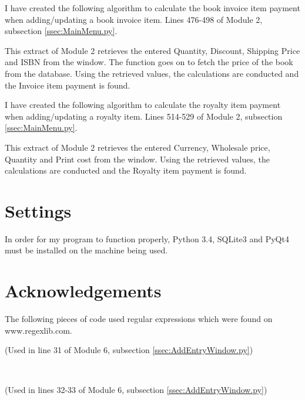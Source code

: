 I have created the following algorithm to calculate the book invoice item payment when adding/updating a book invoice item.
Lines 476-498 of Module 2, subsection \ref{ssec:MainMenu.py}.
\begin{tiny}
\end{tiny}
This extract of Module 2 retrieves the entered Quantity, Discount, Shipping Price and ISBN from the window. The function goes on to fetch the price of the book from the database. Using the retrieved values, the calculations are conducted and the Invoice item payment is found.

I have created the following algorithm to calculate the royalty item payment when adding/updating a royalty item.
Lines 514-529 of Module 2, subsection \ref{ssec:MainMenu.py}.
\begin{tiny}
\end{tiny}
This extract of Module 2 retrieves the entered Currency, Wholesale price, Quantity and Print cost from the window. Using the retrieved values, the calculations are conducted and the Royalty item payment is found.

\section{Settings}

In order for my program to function properly, Python 3.4, SQLite3 and PyQt4 must be installed on the machine being used.

\section{Acknowledgements}
The following pieces of code used regular expressions which were found on www.regexlib.com.
\begin{tiny}
\end{tiny}
(Used in line 31 of Module 6, subsection \ref{ssec:AddEntryWindow.py})

\

\begin{tiny}
\end{tiny}
(Used in lines 32-33 of Module 6, subsection \ref{ssec:AddEntryWindow.py})

